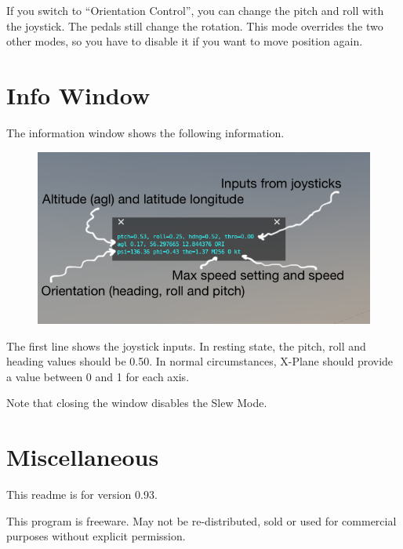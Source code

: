 \documentclass[a4paper,12pt]{article}
\begin{document}
\vspace{0.5\baselineskip}
If you switch to ``Orientation Control'', you can change the pitch and
roll with the joystick. The pedals still change the rotation. This
mode overrides the two other modes, so you have to disable it if you
want to move position again.


\clearpage
\section*{Info Window}

The information window shows the following information. 

\begin{figure}[h!]%
\centering
\includegraphics[width=1.0\textwidth]{infowindow.png}
\label{fig:infowindow}
\end{figure}

The first line shows the joystick inputs. In resting state, the pitch, roll and
heading values should be 0.50. In normal circumstances, X-Plane should provide a
value between 0 and 1 for each axis.

Note that closing the window disables the Slew Mode.

\section*{Miscellaneous}

This readme is for version 0.93. 

\vspace{0.5\baselineskip} {\color{text1}This program is freeware. May not be
  re-distributed, sold or used for commercial purposes without explicit
  permission.}
\end{document}
